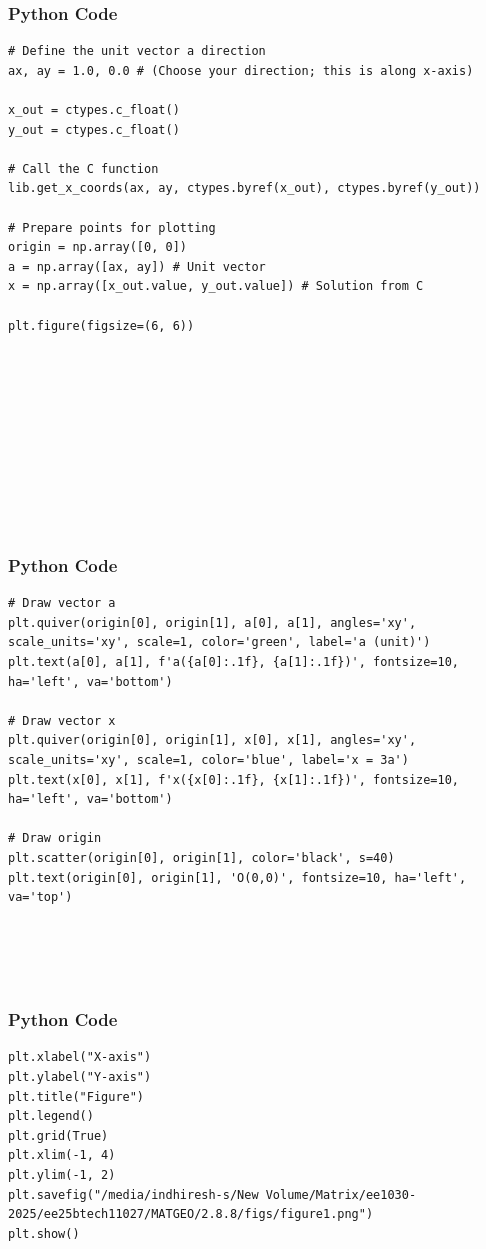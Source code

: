 \documentclass{beamer}
\begin{document}
\begin{frame}[fragile]
    \frametitle{Python Code}
    \begin{lstlisting}
# Define the unit vector a direction
ax, ay = 1.0, 0.0 # (Choose your direction; this is along x-axis)

x_out = ctypes.c_float()
y_out = ctypes.c_float()

# Call the C function
lib.get_x_coords(ax, ay, ctypes.byref(x_out), ctypes.byref(y_out))

# Prepare points for plotting
origin = np.array([0, 0])
a = np.array([ax, ay]) # Unit vector
x = np.array([x_out.value, y_out.value]) # Solution from C

plt.figure(figsize=(6, 6))











    \end{lstlisting}
\end{frame}

\begin{frame}[fragile]
    \frametitle{Python Code}

    \begin{lstlisting}
# Draw vector a
plt.quiver(origin[0], origin[1], a[0], a[1], angles='xy', scale_units='xy', scale=1, color='green', label='a (unit)')
plt.text(a[0], a[1], f'a({a[0]:.1f}, {a[1]:.1f})', fontsize=10, ha='left', va='bottom')

# Draw vector x
plt.quiver(origin[0], origin[1], x[0], x[1], angles='xy', scale_units='xy', scale=1, color='blue', label='x = 3a')
plt.text(x[0], x[1], f'x({x[0]:.1f}, {x[1]:.1f})', fontsize=10, ha='left', va='bottom')

# Draw origin
plt.scatter(origin[0], origin[1], color='black', s=40)
plt.text(origin[0], origin[1], 'O(0,0)', fontsize=10, ha='left', va='top')





    \end{lstlisting}
\end{frame}
\begin{frame}[fragile]
    \frametitle{Python Code}

    \begin{lstlisting}
plt.xlabel("X-axis")
plt.ylabel("Y-axis")
plt.title("Figure")
plt.legend()
plt.grid(True)
plt.xlim(-1, 4)
plt.ylim(-1, 2)
plt.savefig("/media/indhiresh-s/New Volume/Matrix/ee1030-2025/ee25btech11027/MATGEO/2.8.8/figs/figure1.png")
plt.show()



    \end{lstlisting}
\end{frame}
\end{document}
